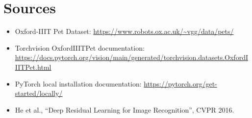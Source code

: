\documentclass[11pt,a4paper]{article}
\begin{document}
\section{Sources}
\begin{itemize}
    \item Oxford-IIIT Pet Dataset: \url{https://www.robots.ox.ac.uk/~vgg/data/pets/}
    \item Torchvision OxfordIIITPet documentation: \url{https://docs.pytorch.org/vision/main/generated/torchvision.datasets.OxfordIIITPet.html}
    \item PyTorch local installation documentation: \url{https://pytorch.org/get-started/locally/}
    \item He et al., ``Deep Residual Learning for Image Recognition'', CVPR 2016.
\end{itemize}
\end{document}
